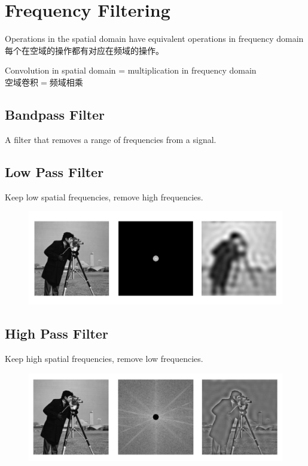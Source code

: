 \documentclass[11pt]{article}
\begin{document}
\section{Frequency Filtering}
Operations in the spatial domain have equivalent operations in frequency domain\\
每个在空域的操作都有对应在频域的操作。
\begin{framed}
  \begin{center}
    Convolution in spatial domain = multiplication in frequency domain\\
    空域卷积$=$频域相乘
  \end{center}
\end{framed}

\subsection{Bandpass Filter}
A filter that removes a range of frequencies from a signal.

\subsection{Low Pass Filter}
Keep low spatial frequencies, remove high frequencies.
\begin{figure}[bht!]
  \centering
  \includegraphics[width=\textwidth]{images/lowpass.png}
\end{figure}

\subsection{High Pass Filter}
Keep high spatial frequencies, remove low frequencies.
\begin{figure}[bht!]
  \centering
  \includegraphics[width=\textwidth]{images/highpass.png}
\end{figure}
\end{document}
